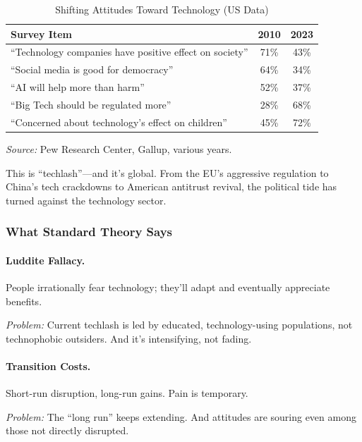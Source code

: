\begin{table}[htbp]
\centering
\caption{Shifting Attitudes Toward Technology (US Data)}
\label{tab:tech-attitudes}
\begin{tabular}{@{}lcc@{}}
\toprule
\textbf{Survey Item} & \textbf{2010} & \textbf{2023} \\
\midrule
``Technology companies have positive effect on society'' & 71\% & 43\% \\
``Social media is good for democracy'' & 64\% & 34\% \\
``AI will help more than harm'' & 52\% & 37\% \\
``Big Tech should be regulated more'' & 28\% & 68\% \\
``Concerned about technology's effect on children'' & 45\% & 72\% \\
\bottomrule
\end{tabular}
\begin{flushleft}
\small\textit{Source:} Pew Research Center, Gallup, various years.
\end{flushleft}
\end{table}

This is ``techlash''---and it's global. From the EU's aggressive regulation to 
China's tech crackdowns to American antitrust revival, the political tide has 
turned against the technology sector.

\subsubsection{What Standard Theory Says}

\paragraph{Luddite Fallacy.}
People irrationally fear technology; they'll adapt and eventually appreciate benefits.

\textit{Problem:} Current techlash is led by educated, technology-using populations, 
not technophobic outsiders. And it's intensifying, not fading.

\paragraph{Transition Costs.}
Short-run disruption, long-run gains. Pain is temporary.

\textit{Problem:} The ``long run'' keeps extending. And attitudes are souring 
even among those not directly disrupted.

